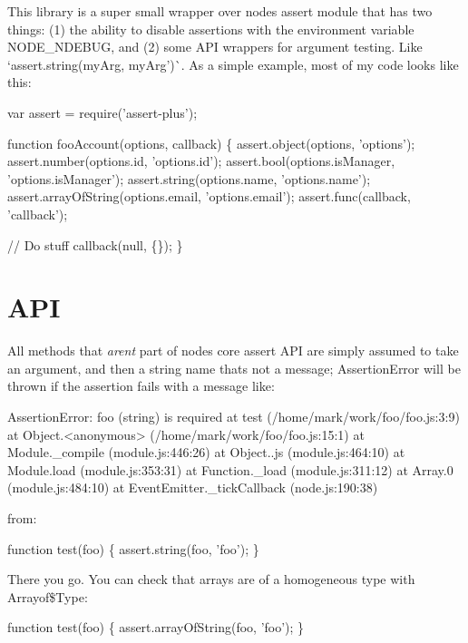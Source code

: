 This library is a super small wrapper over node\textquotesingle{}s assert module that has two things\+: (1) the ability to disable assertions with the environment variable N\+O\+D\+E\+\_\+\+N\+D\+E\+B\+UG, and (2) some A\+PI wrappers for argument testing. Like `assert.\+string(my\+Arg, \textquotesingle{}my\+Arg')\`{}. As a simple example, most of my code looks like this\+:


\begin{DoxyCode}
var assert = require('assert-plus');

function fooAccount(options, callback) \{
    assert.object(options, 'options');
    assert.number(options.id, 'options.id');
    assert.bool(options.isManager, 'options.isManager');
    assert.string(options.name, 'options.name');
    assert.arrayOfString(options.email, 'options.email');
    assert.func(callback, 'callback');

    // Do stuff
    callback(null, \{\});
\}
\end{DoxyCode}


\section*{A\+PI}

All methods that {\itshape aren\textquotesingle{}t} part of node\textquotesingle{}s core assert A\+PI are simply assumed to take an argument, and then a string \textquotesingle{}name\textquotesingle{} that\textquotesingle{}s not a message; {\ttfamily Assertion\+Error} will be thrown if the assertion fails with a message like\+: \begin{DoxyVerb}AssertionError: foo (string) is required
at test (/home/mark/work/foo/foo.js:3:9)
at Object.<anonymous> (/home/mark/work/foo/foo.js:15:1)
at Module._compile (module.js:446:26)
at Object..js (module.js:464:10)
at Module.load (module.js:353:31)
at Function._load (module.js:311:12)
at Array.0 (module.js:484:10)
at EventEmitter._tickCallback (node.js:190:38)
\end{DoxyVerb}


from\+:


\begin{DoxyCode}
function test(foo) \{
    assert.string(foo, 'foo');
\}
\end{DoxyCode}


There you go. You can check that arrays are of a homogeneous type with {\ttfamily Arrayof\$\+Type}\+:


\begin{DoxyCode}
function test(foo) \{
    assert.arrayOfString(foo, 'foo');
\}
\end{DoxyCode}


